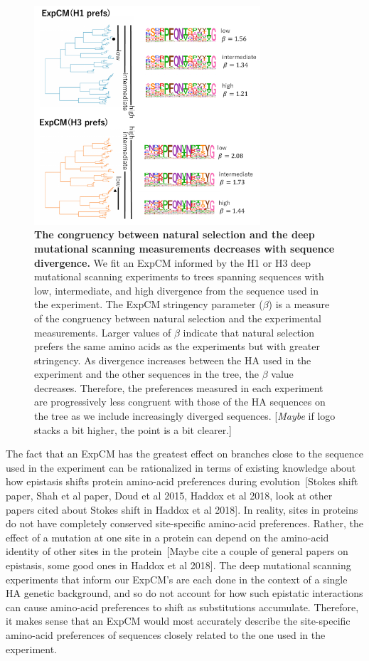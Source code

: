 \documentclass[11pt]{article}
\newcommand\jdbcomment[1]{{\color{red}[#1]}}
\begin{document}
\begin{figure}
\centerline{\includegraphics[width=0.75\textwidth]{figures/compete_3}}
\caption{\label{fig:compete}
\textbf{The congruency between natural selection and the deep mutational scanning measurements decreases with sequence divergence.} 
We fit an ExpCM informed by the H1 or H3 deep mutational scanning experiments to trees spanning sequences with low, intermediate, and high divergence from the sequence used in the experiment. 
The ExpCM stringency parameter ($\beta$) is a measure of the congruency between natural selection and the experimental measurements. 
Larger values of $\beta$ indicate that natural selection prefers the same amino acids as the experiments but with greater stringency. 
As divergence increases between the HA used in the experiment and the other sequences in the tree, the $\beta$ value decreases.
Therefore, the preferences measured in each experiment are progressively less congruent with those of the HA sequences on the tree as we include increasingly diverged sequences. 
\jdbcomment{\emph{Maybe} if logo stacks a bit higher, the point is a bit clearer.}
}
\end{figure}

The fact that an ExpCM has the greatest effect on branches close to the sequence used in the experiment can be rationalized in terms of existing knowledge about how epistasis shifts protein amino-acid preferences during evolution~\jdbcomment{Stokes shift paper, Shah et al paper, Doud et al 2015, Haddox et al 2018, look at other papers cited about Stokes shift in Haddox et al 2018}.
In reality, sites in proteins do not have completely conserved site-specific amino-acid preferences. 
Rather, the effect of a mutation at one site in a protein can depend on the amino-acid identity of other sites in the protein~\jdbcomment{Maybe cite a couple of general papers on epistasis, some good ones in Haddox et al 2018}. 
The deep mutational scanning experiments that inform our ExpCM's are each done in the context of a single HA genetic background, and so do not account for how such epistatic interactions can cause amino-acid preferences to shift as substitutions accumulate. 
Therefore, it makes sense that an ExpCM would most accurately describe the site-specific amino-acid preferences of sequences closely related to the one used in the experiment.
\end{document}

